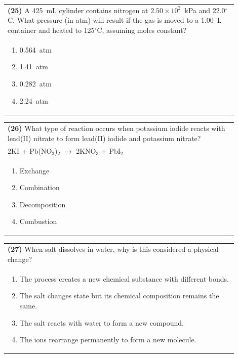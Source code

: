 \documentclass{article}
\begin{document}
\noindent\begin{tabular}{|p{0.9\linewidth}|}
\hline
\textbf{(25)} A 425~mL cylinder contains nitrogen at $2.50\times10^{2}$~kPa and 22.0$^\circ$C. What pressure (in atm) will result if the gas is moved to a 1.00~L container and heated to 125$^\circ$C, assuming moles constant?\\[0.2cm]

\begin{minipage}[t]{0.85\linewidth}
\begin{enumerate}[label=\alph*.]
\item 0.564~atm
\item 1.41~atm
\item 0.282~atm
\item 2.24~atm
\end{enumerate}
\end{minipage}\\[0.2cm]
\hline
\end{tabular}

\noindent\begin{tabular}{|p{0.9\linewidth}|}
\hline
\textbf{(26)} What type of reaction occurs when potassium iodide reacts with lead(II) nitrate to form lead(II) iodide and potassium nitrate?\\[0.2cm]
2KI + Pb(NO$_3$)$_2$ $\rightarrow$ 2KNO$_3$ + PbI$_2$\\[0.2cm]
\begin{minipage}[t]{0.85\linewidth}
\begin{enumerate}[label=\alph*.]
\item Exchange
\item Combination
\item Decomposition
\item Combustion
\end{enumerate}
\end{minipage}\\[0.2cm]
\hline
\end{tabular}

\noindent\begin{tabular}{|p{0.9\linewidth}|}
\hline
\textbf{(27)} When salt dissolves in water, why is this considered a physical change? \\
\begin{minipage}[t]{0.85\linewidth}
\begin{enumerate}[label=\alph*.]
    \item The process creates a new chemical substance with different bonds.
    \item The salt changes state but its chemical composition remains the same.
    \item The salt reacts with water to form a new compound.
    \item The ions rearrange permanently to form a new molecule.
\end{enumerate}
\end{minipage}\\[0.2cm]
\hline
\end{tabular}
\end{document}
